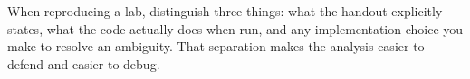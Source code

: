 \begin{keyidea}
When reproducing a lab, distinguish three things: what the handout explicitly states, what the code actually does when run, and any implementation choice you make to resolve an ambiguity. That separation makes the analysis easier to defend and easier to debug.
\end{keyidea}
